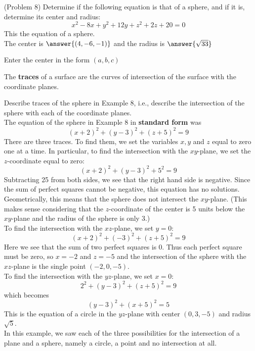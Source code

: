 \documentclass[handout]{ximera}
\begin{document}
\begin{problem}(Problem 8)
Determine if the following equation is that of a sphere, and if it is, determine its center and radius:
\[
x^2 -8x + y^2 + 12y + z^2 + 2z + 20 = 0
\]
This  the equation of a sphere.\\
The center is $\answer{(4,-6,-1)}$ and the radius is $\answer{\sqrt{33}}$
\begin{hint}
Enter the center in the form $(a, b, c)$
\end{hint}
\end{problem}

The {\bf traces} of a surface are the curves of intersection of the surface with the coordinate planes.
\begin{example}[Example 9]
Describe traces of the sphere in Example 8, i.e., describe the intersection of the sphere with each of the coordinate planes.\\
The equation of the sphere in Example 8 in {\bf standard form} was
\[
(x+2)^2 +(y-3)^2 + (z+5)^2 = 9
\]
There are three traces. To find them, we set the variables $x, y$ and $z$ equal to zero one at a time.
In particular, to find the intersection with the $xy$-plane, we set the $z$-coordinate equal to zero:
\[
(x+2)^2 +(y-3)^2 + 5^2 = 9
\]
Subtracting 25 from both sides, we see that the right hand side is negative.  
Since the sum of perfect squares cannot be negative, this equation has no solutions.
Geometrically, this means that the sphere does not intersect the $xy$-plane. 
(This makes sense considering that the $z$-coordinate of the center is 5 units 
below the $xy$-plane and the radius of the sphere is only 3.)\\
To find the intersection with the $xz$-plane, we set $y = 0$:
\[
(x+2)^2 + (-3)^2 + (z+5)^2 = 9
\]
Here we see that the sum of two perfect squares is 0.  Thus each perfect square must be zero, so $x = -2$ and $z = -5$ and 
the intersection of the sphere with the $xz$-plane is the single point $(-2, 0, -5)$.\\
To find the intersection with the $yz$-plane, we set $x = 0$:
\[
2^2 + (y-3)^2 + (z+5)^2 = 9
\]
which becomes
\[
(y-3)^2 + (x+5)^2 = 5
\]
This is the equation of a circle in the $yz$-plane with center $(0, 3, -5)$ and radius $\sqrt 5$.\\
In this example, we saw each of the three possibilities for the intersection of a 
plane and a sphere, namely a circle, a point and no intersection at all.
\end{example}
\end{document}
